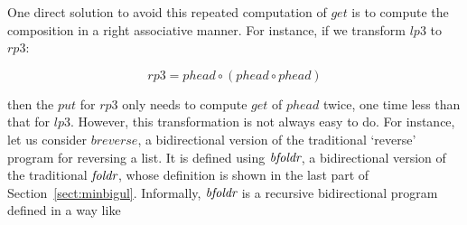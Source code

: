 



One direct solution to avoid this repeated computation of $get$ is to compute the composition in a right associative manner. For instance, if we transform  $lp3$ to $rp3$:

\minusvspacetwo
\vspace{-4mm}
\[
rp3 = phead \circ (phead \circ phead)
\]
\minusvspacetwo

\noindent then the $put$ for $rp3$ only needs to compute $get$ of $phead$ twice, one time less than that for $lp3$.
However, this transformation is not always easy to do. For instance, let us consider $breverse$, a bidirectional version of the traditional `reverse' program for reversing a list. It is defined using $\mbox{\it bfoldr}$, a bidirectional version of the traditional $\mbox{\it foldr}$, whose definition  is shown in the last part of Section~\ref{sect:minbigul}. Informally, $\mbox{\it bfoldr}$ is a recursive bidirectional program defined in a way like

